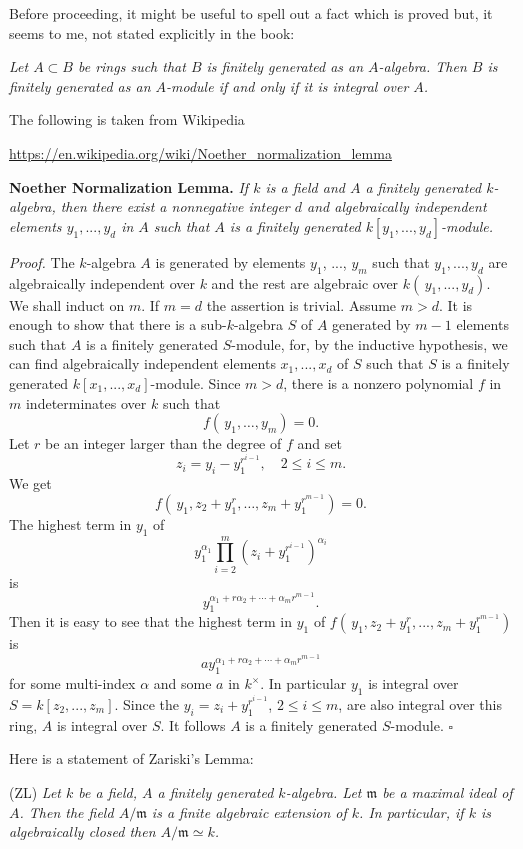 \documentclass[12pt]{article}
\newcommand{\mf}{\mathfrak}
\begin{document}
Before proceeding, it might be useful to spell out a fact which is proved but, it seems to me, not stated explicitly in the book:

\emph{Let $A\subset B$ be rings such that $B$ is finitely generated as an $A$-algebra. Then $B$ is finitely generated as an $A$-module if and only if it is integral over $A$.}

The following is taken from Wikipedia 

\href{https://en.wikipedia.org/wiki/Noether_normalization_lemma}{\small https://en.wikipedia.org/wiki/Noether\_normalization\_lemma}

\textbf{Noether Normalization Lemma.} \emph{If $k$ is a field and $A$ a finitely generated $k$-algebra, then there exist a nonnegative integer $d$ and algebraically independent elements $y_1,...,y_d$ in $A$ such that $A$ is a finitely generated $k[y_1,...,y_d]$-module.}

\emph{Proof.} The $k$-algebra $A$ is generated by elements $y_1$, ..., $y_m$ such that $y_1,..., y_d$ are algebraically independent over $k$ and the rest are algebraic over $k(\,y_1,...,y_d)$. We shall induct on $m$. If $m=d$ the assertion is trivial. Assume $m>d$. It is enough to show that there is a sub-$k$-algebra $S$ of $A$ generated by $m-1$ elements such that $A$ is a finitely generated $S$-module, for, by the inductive hypothesis, we can find algebraically independent elements $x_1,...,x_d$ of $S$ such that $S$ is a finitely generated $k[x_1,...,x_d]$-module. Since $m>d$, there is a nonzero polynomial $f$ in $m$ indeterminates over $k$ such that
$$f(\,y_1,\dots,y_m) = 0.$$
Let $r$ be an integer larger than the degree of $f$ and set
$$z_i=y_i-y_1^{r^{i-1}},\quad2\le i \le m.$$
We get
$$f(\,y_1,z_2+y_1^r,\dots,z_m+y_1^{r^{m-1}})=0.$$
The highest term in $y_1$ of 
$$y_1^{\alpha_1}\prod_{i=2}^m\left(z_i + y_1^{r^{i-1}}\right)^{\alpha_i}$$ 
is
$$y_1^{\alpha_1+r\alpha_2+\cdots+\alpha_m r^{m-1}}.$$
Then it is easy to see that the highest term in $y_1$ of $f(\,y_1,z_2+y_1^r,...,z_m+y_1^{r^{m-1}})$ is 
$$ay_1^{\alpha_1+r\alpha_2+\cdots+\alpha_m r^{m-1}}$$
for some multi-index $\alpha$ and some $a$ in $k^\times$. In particular $y_1$ is integral over $S=k[z_2,...,z_m]$. Since the $y_i=z_i+y_1^{r^{i-1}}$, $2\le i\le m$, are also integral over this ring, $A$ is integral over $S$. It follows $A$ is a finitely generated $S$-module. $\square$

Here is a statement of Zariski's Lemma:

(ZL) \emph{Let $k$ be a field, $A$ a finitely generated $k$-algebra. Let $\mf m$ be a maximal ideal of $A$. Then the field $A/\mf m$ is a finite algebraic extension of $k$. In particular, if $k$ is algebraically closed then $A/\mf m\simeq k$.}
\end{document}
